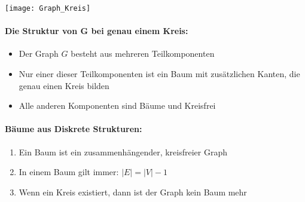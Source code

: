 \begin{center}
	\texttt{[image: Graph\_Kreis]}
\end{center}
\paragraph{Die Struktur von G bei genau einem Kreis:}
\begin{itemize}
	\item Der Graph $G$ besteht aus mehreren Teilkomponenten
	\item Nur einer dieser Teilkomponenten ist ein Baum mit zusätzlichen Kanten, die genau einen Kreis bilden
	\item Alle anderen Komponenten sind Bäume und Kreisfrei
\end{itemize}

\paragraph{Bäume aus Diskrete Strukturen:} 
\begin{enumerate}
	\item Ein Baum ist ein zusammenhängender, kreisfreier Graph
	\item In einem Baum gilt immer: $|E| = |V| - 1 $
	\item Wenn ein Kreis existiert, dann ist der Graph kein Baum mehr
\end{enumerate}